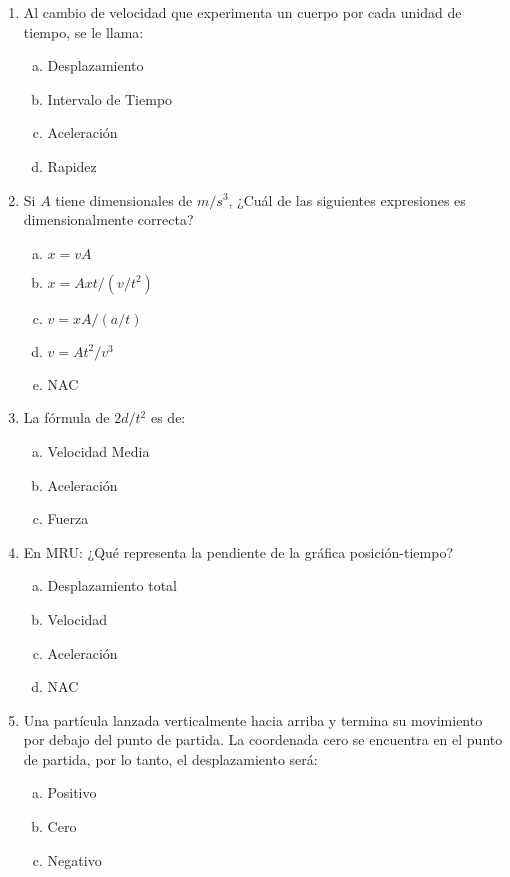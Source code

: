 \begin{multicols}{2}
\begin{enumerate}
	
	\item Al cambio de velocidad que experimenta un cuerpo por cada unidad de tiempo, se le llama:
	\begin{enumerate}[a)]
		\item Desplazamiento
		\item Intervalo de Tiempo
		\item \colorbox[rgb]{1,1,0}{Aceleración}
		\item Rapidez
	\end{enumerate}
	
	
	
	\item Si $A$ tiene dimensionales de $m/s^3$, ¿Cuál de las siguientes expresiones es dimensionalmente correcta?
	\begin{enumerate}[a)]
		\item $x = vA$
		\item $x = Axt/(v/t^2)$
		\item $v = xA/(a/t)$
		\item $v=At^2 /v^3$
		\item \colorbox[rgb]{1,1,0}{NAC}
	\end{enumerate}
	
	
	
	\item La fórmula de $2d/t^2$ es de:
	\begin{enumerate}[a)]
		\item Velocidad Media
		\item \colorbox[rgb]{1,1,0}{Aceleración}
		\item Fuerza
	\end{enumerate}
	
	
	
	\item En MRU: ¿Qué representa la pendiente de la gráfica posición-tiempo?
	\begin{enumerate}[a)]
		\item Desplazamiento total
		\item \colorbox[rgb]{1,1,0}{Velocidad}
		\item Aceleración
		\item NAC
	\end{enumerate}
	
	
	
	\item Una partícula lanzada verticalmente hacia arriba y termina su movimiento por debajo del punto de partida. La coordenada cero se encuentra en el punto de partida, por lo tanto, el desplazamiento será:
	\begin{enumerate}[a)]
		\item Positivo
		\item Cero
		\item \colorbox[rgb]{1,1,0}{Negativo}
	\end{enumerate}
	

\end{enumerate}
\end{multicols}
